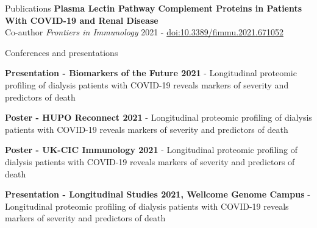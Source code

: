 \documentclass{resume}
\begin{document}
\begin{rSection}{Publications}
\textbf{Plasma Lectin Pathway Complement Proteins in Patients With COVID-19 and Renal Disease} \\
Co-author \hfill  \textit{Frontiers in Immunology} 2021 - \href{https://doi.org/10.3389/fimmu.2021.671052}{doi:10.3389/fimmu.2021.671052}

\end{rSection}

\begin{rSection}{Conferences and presentations}

\item \textbf{Presentation - Biomarkers of the Future 2021} - Longitudinal proteomic profiling of dialysis patients with COVID-19 reveals markers of severity and predictors of death
\vspace{2pt plus 1pt minus 1pt}

\item \textbf{Poster - HUPO Reconnect 2021} - Longitudinal proteomic profiling of dialysis patients with COVID-19 reveals markers of severity and predictors of death
\vspace{2pt plus 1pt minus 1pt}

\item \textbf{Poster - UK-CIC Immunology 2021} - Longitudinal proteomic profiling of dialysis patients with COVID-19 reveals markers of severity and predictors of death
\vspace{2pt plus 1pt minus 1pt}

\item \textbf{Presentation - Longitudinal Studies 2021, Wellcome Genome Campus} - Longitudinal proteomic profiling of dialysis patients with COVID-19 reveals markers of severity and predictors of death
\vspace{2pt plus 1pt minus 1pt}

\end{rSection}
\end{document}

